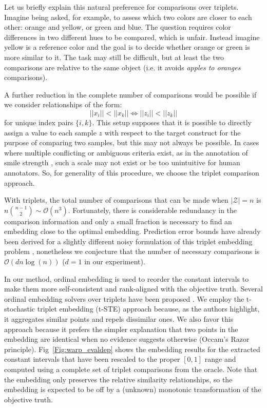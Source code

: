 \documentclass[10pt,letterpaper]{article}
\begin{document}
Let us briefly explain this natural preference for comparisons over triplets.  Imagine being asked, for example, to assess which two colors are closer to each other: orange and yellow, or green and blue.  The question requires color differences in two different hues to be compared, which is unfair.  Instead imagine yellow is a reference color and the goal is to decide whether orange or green is more similar to it.  The task may still be difficult, but at least the two comparisons are relative to the same object (i.e. it avoids \textit{apples to oranges} comparisons).

A further reduction in the complete number of comparisons would be possible if we consider relationships of the form:
\begin{equation*}
||x_i|| < ||x_k|| \Longleftrightarrow ||z_i|| < ||z_k||
\end{equation*}
for unique index pairs $\{i,k\}$.  This setup supposes that it is possible to directly assign a value to each sample $z$ with respect to the target construct for the purpose of comparing two samples, but this may not always be possible.  In cases where multiple conflicting or ambiguous criteria exist, as in the annotation of smile strength \cite{Gupta2016}, such a scale may not exist or be too unintuitive for human annotators.  So, for generality of this procedure, we choose the triplet comparison approach.

With triplets, the total number of comparisons that can be made when $|\mathcal{Z}|=n$ is $n\binom{n-1}{2} \sim \mathcal{O}(n^3)$.  Fortunately, there is considerable redundancy in the comparison information and only a small fraction is necessary to find an embedding close to the optimal embedding.  Prediction error bounds have already been derived for a slightly different noisy formulation of this triplet embedding problem \cite{jain2016finite}, nonetheless we conjecture that the number of necessary comparisons is $\mathcal{O}(d n\log(n))$ ($d=1$ in our experiment).

In our method, ordinal embedding is used to reorder the constant intervals to make them more self-consistent and rank-aligned with the objective truth.  Several ordinal embedding solvers over triplets have been proposed \cite{agarwal2007generalized, tamuz2011adaptively, van2012stochastic, amid2015multiview}.  We employ the t-stochastic triplet embedding (t-STE) approach \cite{van2012stochastic} because, as the authors highlight, it aggregates similar points and repels dissimilar ones.  We also favor this approach because it prefers the simpler explanation that two points in the embedding are identical when no evidence suggests otherwise (Occam's Razor principle).  Fig~\ref{Fig:warp_evaldep} shows the embedding results for the extracted constant intervals that have been rescaled to the proper $[0,1]$ range and computed using a complete set of triplet comparisons from the oracle.  Note that the embedding only preserves the relative similarity relationships, so the embedding is expected to be off by a (unknown) monotonic transformation of the objective truth.
\end{document}
